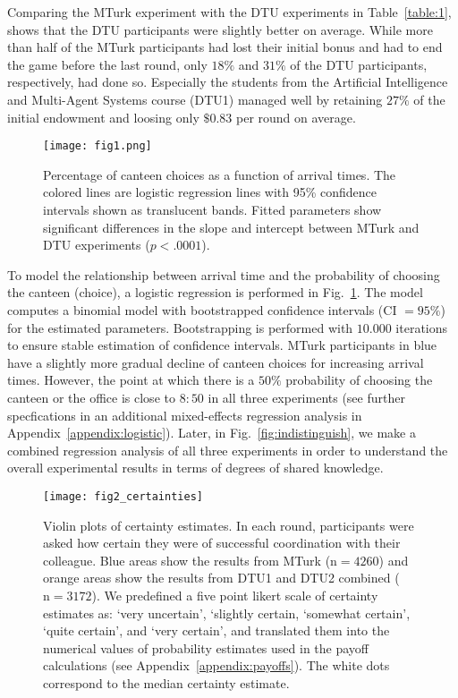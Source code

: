 Comparing the MTurk experiment with the DTU experiments in Table~\ref{table:1}, shows that the DTU participants were slightly better on average. While more than half of the MTurk participants had lost their initial bonus and had to end the game before the last round, only $18\%$ and $31\%$ of the DTU participants, respectively, had done so. Especially the students from the Artificial Intelligence and Multi-Agent Systems course (DTU1) managed well by retaining $27\%$ of the initial endowment and loosing only $\$0.83$ per round on average. %

\begin{figure} %
	\centering\texttt{[image: fig1.png]}
	\caption{Percentage of canteen choices as a function of arrival times. The colored lines are logistic regression lines with 95\% confidence intervals shown as translucent bands. Fitted parameters show significant differences in the slope and intercept between MTurk and DTU experiments ($p < .0001$).}
	\label{fig:1}
\end{figure}

To model the relationship between arrival time and the probability of choosing the canteen (choice), a logistic regression is performed in Fig.~\ref{fig:1}. The model computes a binomial model with bootstrapped confidence intervals (CI $=95\%$) for the estimated parameters. Bootstrapping is performed with $10.000$ iterations to ensure stable estimation of confidence intervals. MTurk participants in blue have a slightly more gradual decline of canteen choices for increasing arrival times. However, the point at which there is a $50\%$ probability of choosing the canteen or the office is close to $8{:}50$ in all three experiments (see further specfications in an additional mixed-effects regression analysis in Appendix~\ref{appendix:logistic}). Later, in Fig.~\ref{fig:indistinguish}, we make a combined regression analysis of all three experiments in order to understand the overall experimental results in terms of degrees of shared knowledge.

\begin{figure} %
\centering\texttt{[image: fig2\_certainties]}
\caption{Violin plots of certainty estimates. In each round, participants were asked how certain they were of successful coordination with their colleague. Blue areas show the results from MTurk ($\text{n}=4260$) and orange areas show the results from DTU1 and DTU2 combined ($\text{n}=3172$). We predefined a five point likert scale of certainty estimates as: `very uncertain', `slightly certain, `somewhat certain', `quite certain', and `very certain', and translated them into the numerical values of probability estimates used in the payoff calculations (see Appendix~\ref{appendix:payoffs}). The white dots correspond to the median certainty estimate.}
\label{fig:certain}
\end{figure}

